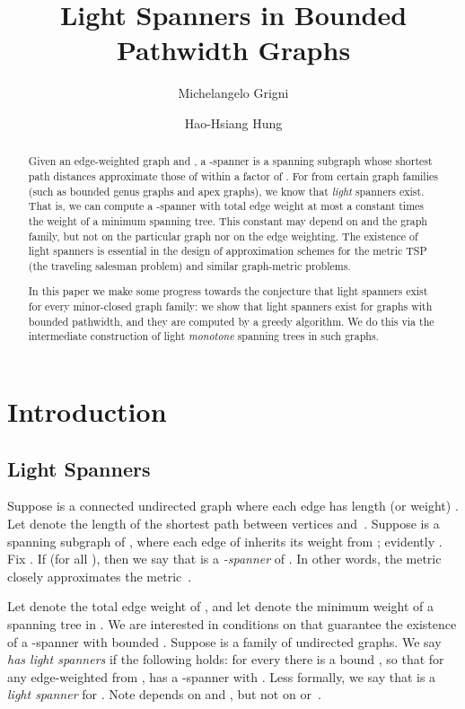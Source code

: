 \documentclass{llncs}
\title{Light Spanners in Bounded Pathwidth Graphs}
\author{Michelangelo Grigni \and  Hao-Hsiang Hung}
\institute{Dept.\ of Math \&\ CS, Emory University,
\textsl{\{mic,hhung2\}@mathcs.emory.edu}}
\begin{document}
\maketitle



\begin{abstract}

Given an edge-weighted graph  and , a
-spanner is a spanning subgraph  whose shortest path
distances approximate those of  within a factor of .  
For  from certain graph families (such as bounded genus graphs and apex
graphs), we know that \emph{light} spanners exist.  That is, we can
compute a -spanner  with total edge weight at most a
constant times the weight of a minimum spanning tree.  This constant
may depend on  and the graph family, but not on the
particular graph  nor on the edge weighting.  The existence of
light spanners is essential in the design of approximation schemes for
the metric TSP (the traveling salesman problem) and similar
graph-metric problems.

In this paper we make some progress towards the conjecture that light
spanners exist for every minor-closed graph family: we show that light
spanners exist for graphs with bounded pathwidth, and they are computed
by a greedy algorithm.  We do this via the intermediate construction of
light \emph{monotone} spanning trees in such graphs.
\end{abstract}


\section{Introduction}


\subsection{Light Spanners}

Suppose  is a connected undirected graph where each edge  has
length (or weight) .  Let  denote the length
of the shortest path between vertices  and~.  Suppose  is a
spanning subgraph of , where each edge of  inherits its weight
from ; evidently .  Fix .
If  (for all ),
then we say that  is a \emph{-spanner} of .  In
other words, the metric  closely approximates the
metric~.

Let  denote the total edge weight of , and let 
denote the minimum weight of a spanning tree in .  We are
interested in conditions on  that guarantee the existence of a
-spanner  with bounded .
Suppose  is a family of undirected graphs.  We
say \emph{ has light spanners} if the following
holds: for every  there is a bound , so that
for any edge-weighted  from ,  has a
-spanner  with .
Less formally, we say that  is a \emph{light spanner} for .
Note  depends on  and , but not on
 or~.
\end{document}

